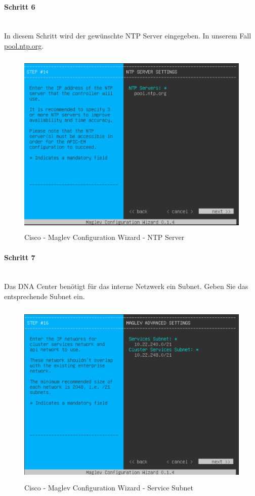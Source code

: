 \paragraph{Schritt 6}
~\\
In diesem Schritt wird der gewünschte NTP Server eingegeben. In unserem Fall \url{pool.ntp.org}.
\begin{figure}[H]
	\centering
	\includegraphics[height=9cm]{img/installguide/installguide-step14.PNG}
	\caption{Cisco - Maglev Configuration Wizard - NTP Server}
	\label{fig:installguide-dna-center-install-step-14}
\end{figure} 

\paragraph{Schritt 7}
~\\
Das DNA Center benötigt für das interne Netzwerk ein Subnet. Geben Sie das entsprechende Subnet ein.
\begin{figure}[H]
	\centering
	\includegraphics[height=9cm]{img/installguide/installguide-step16.PNG}
	\caption{Cisco - Maglev Configuration Wizard - Service Subnet}
	\label{fig:installguide-dna-center-install-step-16}
\end{figure} 


